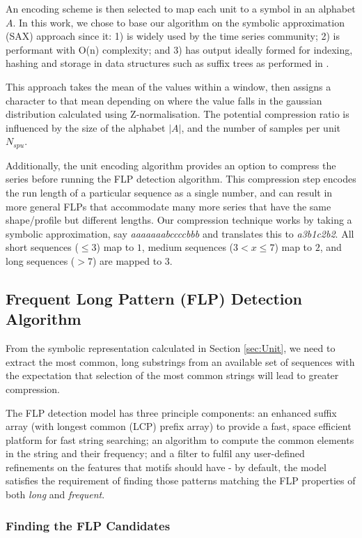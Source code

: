 An encoding scheme is then selected to map each unit to a symbol in an alphabet $A$.
In this work, we chose to base our algorithm on the symbolic approximation (SAX) approach since it:
1) is widely used by the time series community;
2) is performant with O(n) complexity; and
3) has output ideally formed for indexing, hashing and storage in data structures such as suffix trees as performed in \cite{lin2005}. 

This approach takes the mean of the values within a window, then assigns a character to that mean depending on where the value falls in the gaussian distribution calculated using Z-normalisation.
The potential compression ratio is influenced by the size of the alphabet $|A|$, and the number of samples per unit $N_{spu}$.

Additionally, the unit encoding algorithm provides an option to compress the series before running the FLP detection algorithm.
This compression step encodes the run length of a particular sequence as a single number, and can result in more general FLPs that accommodate many more series that have the same shape/profile but different lengths.
Our compression technique works by taking a symbolic approximation, say \emph{aaaaaaabccccbbb} and translates this to \emph{a3b1c2b2}. All short sequences ($\le 3$) map to $1$, medium sequences ($3 < x \le 7$) map to $2$, and long sequences ($>7$) are mapped to $3$.

\subsection{Frequent Long Pattern (FLP) Detection Algorithm}
\label{sec:FLP}

From the symbolic representation calculated in Section \ref{sec:Unit}, we need to extract the most common, long substrings from an available set of sequences with the expectation that selection of the most common strings will lead to greater compression. 

The FLP detection model has three principle components: an enhanced suffix array (with longest common (LCP) prefix array) to provide a fast, space efficient platform for fast string searching; an algorithm to compute the common elements in the string and their frequency; and a filter to fulfil any user-defined refinements on the features that motifs should have - by default, the model satisfies the requirement of finding those patterns matching the FLP properties of both \emph{long} and \emph{frequent}.

\subsubsection{Finding the FLP Candidates}
\label{sec:Find}

